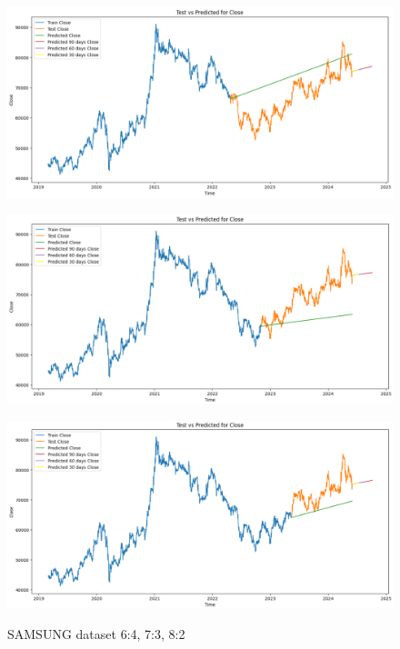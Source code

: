 \documentclass[conference]{IEEEtran}
\begin{document}
\begin{figure}[H]
    \centering
    \begin{minipage}{0.15\textwidth}
    \centering
    \includegraphics[width=1\textwidth]{Image/VARMA/SAMSUNG/6_4.png}
   
    \label{fig:1}
    \end{minipage}%
    \begin{minipage}{0.15\textwidth}
    \centering
    \includegraphics[width=1\textwidth]{Image/VARMA/SAMSUNG/7_3.png}
  
    \label{fig:2}
    \end{minipage}%
    \begin{minipage}{0.15\textwidth}
    \centering
    \includegraphics[width=1\textwidth]{Image/VARMA/SAMSUNG/8_2.png}

    \label{fig:3}
    \end{minipage}
    \caption{ SAMSUNG dataset 6:4, 7:3, 8:2 }
\end{figure}
\end{document}
